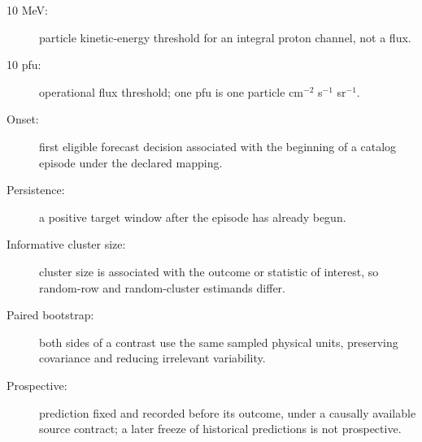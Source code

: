 \documentclass[11pt]{article}
\begin{document}
\begin{description}
\item[10 MeV:] particle kinetic-energy threshold for an integral proton channel, not a flux.
\item[10 pfu:] operational flux threshold; one pfu is one particle cm$^{-2}$ s$^{-1}$ sr$^{-1}$.
\item[Onset:] first eligible forecast decision associated with the beginning of a catalog episode under the declared mapping.
\item[Persistence:] a positive target window after the episode has already begun.
\item[Informative cluster size:] cluster size is associated with the outcome or statistic of interest, so random-row and random-cluster estimands differ.
\item[Paired bootstrap:] both sides of a contrast use the same sampled physical units, preserving covariance and reducing irrelevant variability.
\item[Prospective:] prediction fixed and recorded before its outcome, under a causally available source contract; a later freeze of historical predictions is not prospective.
\end{description}
\end{document}
